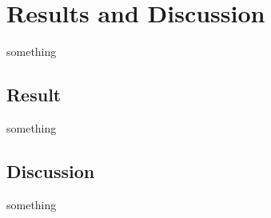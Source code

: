 \section{Results and Discussion}
    something

\subsection{Result}
    something

\subsection{Discussion}
    something